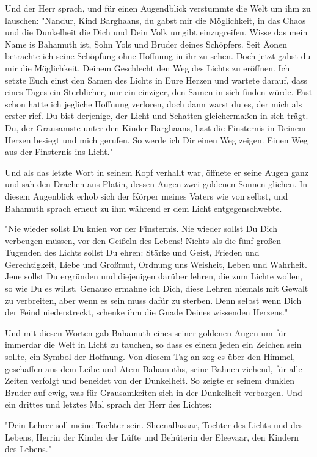\documentclass[14pt,twoside,BCOR=12mm,DIV=classic]{scrbook}
\begin{document}
Und der Herr sprach, und für einen Augendblick verstummte die Welt um ihm zu
lauschen: "Nandur, Kind Barghaans, du gabst mir die Möglichkeit, in das Chaos
und die Dunkelheit die Dich und Dein Volk umgibt einzugreifen. Wisse das mein
Name is Bahamuth ist, Sohn Yols und Bruder deines Schöpfers. Seit Äonen
betrachte ich seine Schöpfung ohne Hoffnung in ihr zu sehen. Doch jetzt gabst du
mir die Möglichkeit, Deinem Geschlecht den Weg des Lichts zu eröffnen. Ich
setzte Euch einst den Samen des Lichts in Eure Herzen und wartete darauf, dass
eines Tages ein Sterblicher, nur ein einziger, den Samen in sich finden würde.
Fast schon hatte ich jegliche Hoffnung verloren, doch dann warst du es, der mich
als erster rief. Du bist derjenige, der Licht und Schatten gleichermaßen in sich
trägt. Du, der Grausamste unter den Kinder Barghaans, hast die Finsternis in
Deinem Herzen besiegt und mich gerufen. So werde ich Dir einen Weg zeigen. Einen
Weg aus der Finsternis ins Licht."

Und als das letzte Wort in seinem Kopf verhallt war, öffnete er seine Augen ganz
und sah den Drachen aus Platin, dessen Augen zwei goldenen Sonnen glichen. In
diesem Augenblick erhob sich der Körper meines Vaters wie von selbst, und
Bahamuth sprach erneut zu ihm während er dem Licht entgegenschwebte.

"Nie wieder sollst Du knien vor der Finsternis. Nie wieder sollst Du Dich
verbeugen müssen, vor den Geißeln des Lebens!
Nichts als die fünf großen Tugenden des Lichts sollst Du ehren:
Stärke und Geist,
Frieden und Gerechtigkeit,
Liebe und Großmut,
Ordnung uns Weisheit,
Leben und Wahrheit.
Jene sollst Du ergründen und diejenigen darüber lehren, die zum Lichte wollen,
so wie Du es willst. Genauso ermahne ich Dich, diese Lehren niemals mit Gewalt
zu verbreiten, aber wenn es sein muss dafür zu sterben. Denn selbst wenn Dich
der Feind niederstreckt, schenke ihm die Gnade Deines wissenden Herzens."

Und mit diesen Worten gab Bahamuth eines seiner goldenen Augen um für immerdar
die Welt in Licht zu tauchen, so dass es einem jeden ein Zeichen sein sollte,
ein Symbol der Hoffnung. Von diesem Tag an zog es über den Himmel, geschaffen
aus dem Leibe und Atem Bahamuths, seine Bahnen ziehend, für alle Zeiten verfolgt
und beneidet von der Dunkelheit. So zeigte er seinem dunklen Bruder auf ewig,
was für Grausamkeiten sich in der Dunkelheit verbargen. Und ein drittes und
letztes Mal sprach der Herr des Lichtes:

"Dein Lehrer soll meine Tochter sein. Sheenallasaar, Tochter des Lichts und des
Lebens, Herrin der Kinder der Lüfte und Behüterin der Eleevaar, den Kindern des
Lebens."
\end{document}
